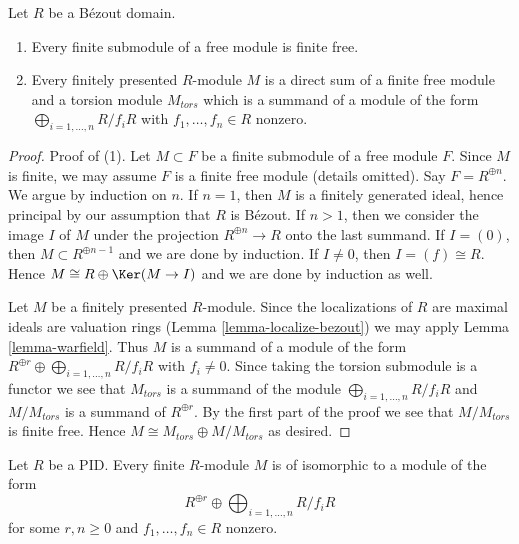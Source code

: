 \begin{lemma}
\label{lemma-split-off-free-part}
Let $R$ be a B\'ezout domain.
\begin{enumerate}
\item Every finite submodule of a free module is finite free.
\item Every finitely presented $R$-module $M$ is a direct sum of a
finite free module and a torsion module $M_{tors}$ which is a
summand of a module of the form $\bigoplus_{i = 1, \ldots, n} R/f_iR$
with $f_1, \ldots, f_n \in R$ nonzero.
\end{enumerate}
\end{lemma}

\begin{proof}
Proof of (1). Let $M \subset F$ be a finite submodule of a free module $F$.
Since $M$ is finite, we may assume $F$ is a finite free module
(details omitted). Say $F = R^{\oplus n}$. We argue by induction
on $n$. If $n = 1$, then $M$ is a finitely generated ideal, hence
principal by our assumption that $R$ is B\'ezout. If $n > 1$, then
we consider the image $I$ of $M$ under the projection
$R^{\oplus n} \to R$ onto the last summand. If $I = (0)$, then
$M \subset R^{\oplus n - 1}$ and we are done by induction.
If $I \not = 0$, then $I = (f) \cong R$. Hence
$M \cong R \oplus \Ker(M \to I)$ and we are done by induction as well.

\medskip\noindent
Let $M$ be a finitely presented $R$-module. Since the localizations
of $R$ are maximal ideals are valuation rings
(Lemma \ref{lemma-localize-bezout})
we may apply Lemma \ref{lemma-warfield}.
Thus $M$ is a summand of a module of the form
$R^{\oplus r} \oplus \bigoplus_{i = 1, \ldots, n} R/f_iR$
with $f_i \not = 0$. Since taking the torsion submodule is
a functor we see that $M_{tors}$ is
a summand of the module $\bigoplus_{i = 1, \ldots, n} R/f_iR$
and $M/M_{tors}$ is a summand of $R^{\oplus r}$.
By the first part of the proof we see that $M/M_{tors}$ is
finite free. Hence $M \cong M_{tors} \oplus M/M_{tors}$
as desired.
\end{proof}

\begin{lemma}
\label{lemma-modules-PID}
Let $R$ be a PID. Every finite $R$-module $M$ is of isomorphic
to a module of the form
$$
R^{\oplus r} \oplus \bigoplus\nolimits_{i = 1, \ldots, n} R/f_iR
$$
for some $r, n \geq 0$ and $f_1, \ldots, f_n \in R$ nonzero.
\end{lemma}

